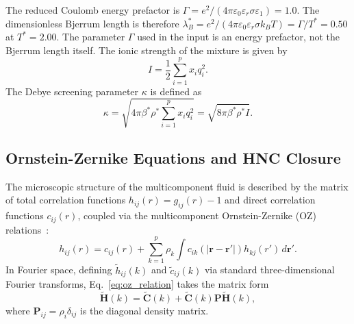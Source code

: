 \documentclass[aps,pre,twocolumn,superscriptaddress,floatfix]{revtex4-2}
\begin{document}
The reduced Coulomb energy prefactor is $\Gamma=e^2/(4\pi\varepsilon_0\varepsilon_r\sigma\varepsilon_1)=1.0$. The dimensionless Bjerrum length is therefore $\lambda_B^*=e^2/(4\pi\varepsilon_0\varepsilon_r\sigma k_BT)=\Gamma/T^*=0.50$ at $T^*=2.00$. The parameter $\Gamma$ used in the input is an energy prefactor, not the Bjerrum length itself. The ionic strength of the mixture is given by
\begin{equation}
I = \frac{1}{2} \sum_{i=1}^p x_i q_i^2.
\label{eq:ionic_strength}
\end{equation}
The Debye screening parameter $\kappa$ is defined as
\begin{equation}
\kappa = \sqrt{4\pi \beta^* \rho^* \sum_{i=1}^p x_i q_i^2} = \sqrt{8\pi \beta^* \rho^* I}.
\label{eq:debye_kappa}
\end{equation}

\subsection{Ornstein-Zernike Equations and HNC Closure}

The microscopic structure of the multicomponent fluid is described by the matrix of total correlation functions $h_{ij}(r) = g_{ij}(r) - 1$ and direct correlation functions $c_{ij}(r)$, coupled via the multicomponent Ornstein-Zernike (OZ) relations~\cite{HansenMcDonald4th}:
\begin{equation}
h_{ij}(r) = c_{ij}(r) + \sum_{k=1}^p \rho_k \int c_{ik}(|\mathbf{r} - \mathbf{r}'|) h_{kj}(r') \, d\mathbf{r}'.
\label{eq:oz_relation}
\end{equation}
In Fourier space, defining $\tilde{h}_{ij}(k)$ and $\tilde{c}_{ij}(k)$ via standard three-dimensional Fourier transforms, Eq.~\eqref{eq:oz_relation} takes the matrix form
\begin{equation}
\tilde{\mathbf{H}}(k) = \tilde{\mathbf{C}}(k) + \tilde{\mathbf{C}}(k) \mathbf{P} \tilde{\mathbf{H}}(k),
\label{eq:oz_matrix}
\end{equation}
where $\mathbf{P}_{ij} = \rho_i \delta_{ij}$ is the diagonal density matrix.
\end{document}
